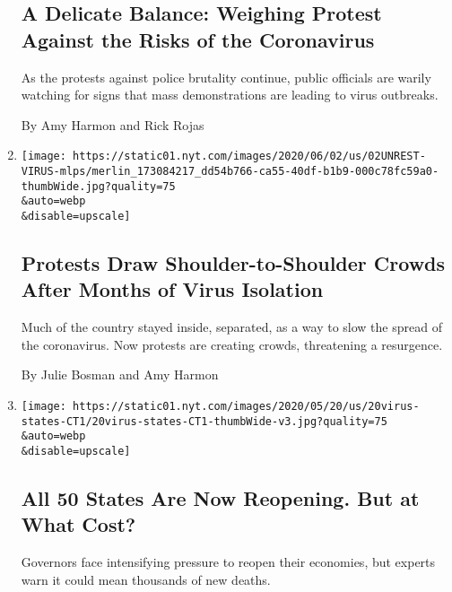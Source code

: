 \begin{enumerate}
  \hypertarget{a-delicate-balance-weighing-protest-against-the-risks-of-the-coronavirus}{%
  \subsection{A Delicate Balance: Weighing Protest Against the Risks of
  the
  Coronavirus}\label{a-delicate-balance-weighing-protest-against-the-risks-of-the-coronavirus}}

  As the protests against police brutality continue, public officials
  are warily watching for signs that mass demonstrations are leading to
  virus outbreaks.

  By Amy Harmon and Rick Rojas
\item
  \href{/2020/06/02/us/coronavirus-protests-george-floyd.html}{}

  \texttt{[image: https://static01.nyt.com/images/2020/06/02/us/02UNREST-VIRUS-mlps/merlin\_173084217\_dd54b766-ca55-40df-b1b9-000c78fc59a0-thumbWide.jpg?quality=75\\\&auto=webp\\\&disable=upscale]}

  \hypertarget{protests-draw-shoulder-to-shoulder-crowds-after-months-of-virus-isolation}{%
  \subsection{Protests Draw Shoulder-to-Shoulder Crowds After Months of
  Virus
  Isolation}\label{protests-draw-shoulder-to-shoulder-crowds-after-months-of-virus-isolation}}

  Much of the country stayed inside, separated, as a way to slow the
  spread of the coronavirus. Now protests are creating crowds,
  threatening a resurgence.

  By Julie Bosman and Amy Harmon
\item
  \href{/2020/05/20/us/coronavirus-reopening-50-states.html}{}

  \texttt{[image: https://static01.nyt.com/images/2020/05/20/us/20virus-states-CT1/20virus-states-CT1-thumbWide-v3.jpg?quality=75\\\&auto=webp\\\&disable=upscale]}

  \hypertarget{all-50-states-are-now-reopening-but-at-what-cost}{%
  \subsection{All 50 States Are Now Reopening. But at What
  Cost?}\label{all-50-states-are-now-reopening-but-at-what-cost}}

  Governors face intensifying pressure to reopen their economies, but
  experts warn it could mean thousands of new deaths.


\end{enumerate}
